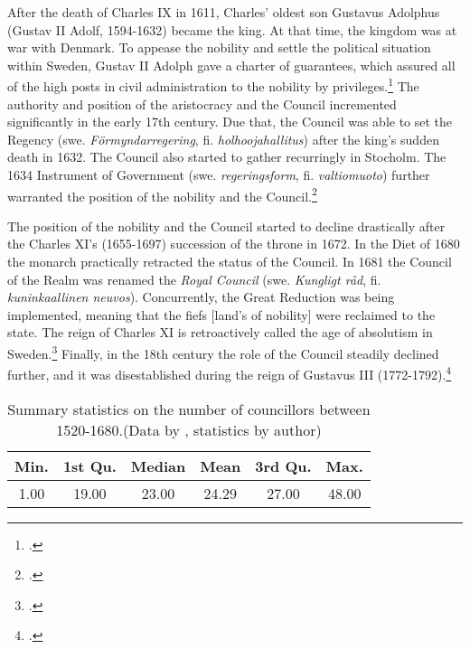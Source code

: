 After the death of Charles IX in 1611, Charles' oldest son Gustavus Adolphus (Gustav II Adolf, 1594-1632) became the king. At that time, the kingdom was at war with Denmark. To appease the nobility and settle the political situation within Sweden, Gustav II Adolph gave a charter of guarantees, which assured all of the high posts in civil administration to the nobility by privileges.\footcites[pp. 121-123,]{pSuurvalta}[pp. 8-9.]{personalAgency} The authority and position of the aristocracy and the Council incremented significantly in the early 17th century. Due that, the Council was able to set the Regency (swe. \textit{Förmyndarregering}, fi. \textit{holhoojahallitus}) after the king's sudden death in 1632. The Council also started to gather recurringly in Stocholm. The 1634 Instrument of Government (swe. \textit{regeringsform}, fi. \textit{valtiomuoto}) further warranted the position of the nobility and the Council.\footcites[pp. 195-197,]{pSuurvalta}[pp. 16-17,]{agencyAndStateBuilding}[pp. 8-9.]{personalAgency}

The position of the nobility and the Council started to decline drastically after the Charles XI's (1655-1697) succession of the throne in 1672. In the Diet of 1680 the monarch practically retracted the status of the Council. In 1681 the Council of the Realm was renamed the \textit{Royal Council} (swe. \textit{Kungligt råd}, fi. \textit{kuninkaallinen neuvos}). Concurrently, the Great Reduction was being implemented, meaning that the fiefs [land's of nobility] were reclaimed to the state. The reign of Charles XI is retroactively called the age of absolutism in Sweden.\footcites[pp. 289-295,]{pSuurvalta}[pp. 8-9.]{personalAgency} Finally, in the 18th century the role of the Council steadily declined further, and it was disestablished during the reign of Gustavus III (1772-1792).\footcite[p. 14.]{hopesAndFearsIntro}

\begin{table}
	\caption[Summary statistics on the number of councillors between 1520-1680]{Summary statistics on the number of councillors between 1520-1680.(Data by \cite{councillorsDS}, statistics by author)}
	\label{tab:councillors}
	\centering
	\begin{tabular}{c c c c c c}
		\hline
		Min. & 1st Qu. & Median & Mean & 3rd Qu. & Max.\\
		\hline
		1.00 & 19.00 & 23.00 & 24.29 & 27.00 & 48.00\\
		\hline
	\end{tabular}
\end{table}

